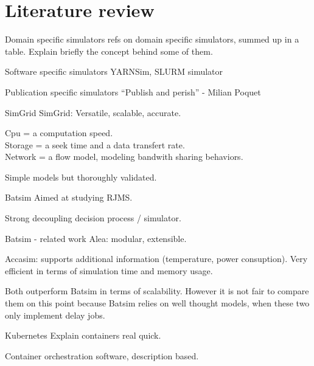 \documentclass[12pt, aspectratio=43]{beamer}
\begin{document}
\section{Literature review}
\begin{frame}{Domain specific simulators}
	refs on domain specific simulators, summed up in a table. Explain
	briefly the concept behind some of them.
\end{frame}

\begin{frame}{Software specific simulators}
	YARNSim, SLURM simulator
\end{frame}

\begin{frame}{Publication specific simulators}
	``Publish and perish'' - Milian Poquet
\end{frame}

\begin{frame}{SimGrid}
	SimGrid: Versatile, scalable, accurate.

	Cpu = a computation speed.\\
	Storage = a seek time and a data transfert rate.\\
	Network = a flow model, modeling bandwith sharing behaviors.

	Simple models but thoroughly validated.
\end{frame}

\begin{frame}{Batsim}
	Aimed at studying RJMS.

	Strong decoupling decision process / simulator.
\end{frame}

\begin{frame}{Batsim - related work}
	Alea: modular, extensible.

	Accasim: supports additional information (temperature, power
	consuption). Very efficient in terms of simulation time and memory
	usage.

	Both outperform Batsim in terms of scalability. However it is not fair
	to compare them on this point because Batsim relies on well thought
	models, when these two only implement delay jobs.
\end{frame}

\begin{frame}{Kubernetes}
	Explain containers real quick.

	Container orchestration software, description based.
\end{frame}
\end{document}
